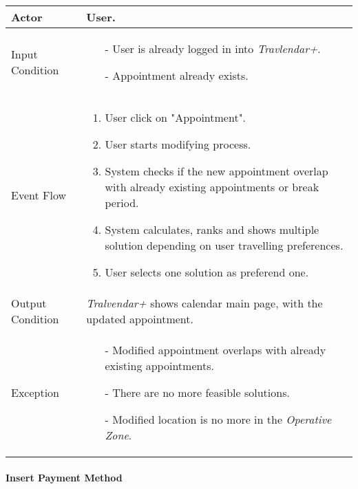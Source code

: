		\begin{tabular}{| l | p{} | }
			\hline
			\hline
			Actor	&		User. \\
			\hline
			Input Condition		&		\begin{itemize}
													\item[-] User is already logged in into \textit{Travlendar+}.
													\item[-] Appointment already exists.
												\end{itemize} \\
			\hline
			Event Flow		&		\begin{enumerate}
												\item User click on "Appointment".
												\item User starts modifying process.
												\item System checks if the new appointment overlap with already existing appointments or break period.
												\item	 System calculates, ranks and shows multiple solution depending on user travelling preferences.
												\item User selects one solution as preferend one.
											\end{enumerate} \\
			\hline
			Output Condition		&		\textit{Tralvendar+} shows calendar main page, with the updated appointment. \\
			\hline		
			Exception		&		\begin{itemize}
											\item[-] Modified appointment overlaps with already existing appointments.
											\item[-] There are no more feasible solutions.
											\item[-] Modified location is no more in the \textit{Operative Zone}.
										\end{itemize} \\
			\hline
			\hline
		\end{tabular}
		
		

	\paragraph{Insert Payment Method}
	
